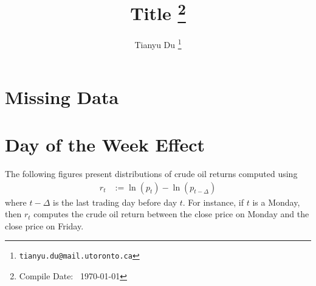 \documentclass[12pt]{article}
\title{Title \footnote{Compile Date: \currenttime\ \today}}
\author{Tianyu Du \footnote{\texttt{tianyu.du@mail.utoronto.ca}}}
\begin{document}
	\maketitle
	\tableofcontents
	\newpage

	\section{Missing Data}
	\par
 
	\section{Day of the Week Effect}
	\par \cite{Hess1981}
	\par The following figures present distributions of crude oil returns computed using
	\begin{align}
		r_t &:= \ln(p_t) - \ln(p_{t - \Delta})
	\end{align}
	where $t - \Delta$ is the last trading day before day $t$. For instance, if $t$ is a Monday, then $r_t$ computes the crude oil return between the close price on Monday and the close price on Friday.
\end{document}
